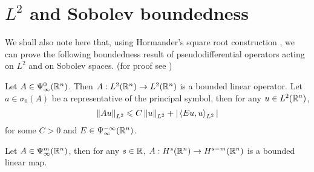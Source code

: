 \documentclass[12pt]{article}
\begin{document}
\section{$L^2$ and Sobolev boundedness} 
We shall also note here that, using Hormander's square root construction \cite{}, we can prove the following boundedness result of pseudodifferential operators acting on $L^2$ and on Sobolev spaces. (for proof see )

\begin{fprop}
    Let $A \in \Psi^{0}_{\infty}(\R^n)$. Then $A : L^2(\R^n) \to L^2(\R^n)$ is a bounded linear operator. Let $a \in \sigma_0(A)$ be a representative of the principal symbol, then for any $u \in L^2(\R^n)$, 
    \begin{align*}
    \norm[A u ]_{L^2} \leq C \norm[u]_{L^2} + \abs{\inprod[Eu, u]_{L^2}}
    \end{align*}
    for some $C > 0$ and $E \in \Psi^{-\infty}_{\infty}(\R^n)$. 
\end{fprop}

\begin{fprop}
    Let $A \in \Psi^{m}_{\infty}(\R^n)$, then for any $s \in \R$, $A : H^{s}(\R^n) \to H^{s - m}(\R^n)$ is a bounded linear map. 
\end{fprop}
\end{document}
